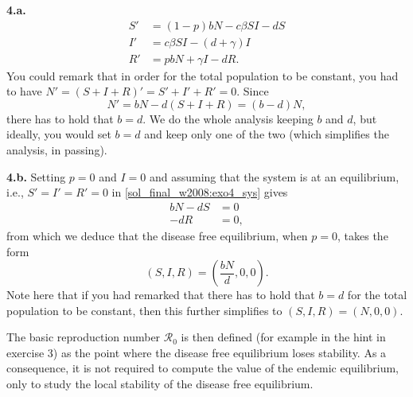 \documentclass[12pt]{article}
\theoremstyle{plain}
\def\Rzero{\mathcal{R}_0}
\begin{document}
\textbf{4.a.}
\begin{subequations}\label{sol_final_w2008:exo4_sys}
\begin{align}
S' &= (1-p)bN-c\beta SI-dS \\
I' &= c\beta SI-(d+\gamma)I \\
R' &= pbN+\gamma I-dR.
\end{align}
\end{subequations}
You could remark that in order for the total population to be constant, you had to have $N'=(S+I+R)'=S'+I'+R'=0$. Since 
\[
N'=bN-d(S+I+R)=(b-d)N,
\]
there has to hold that $b=d$. We do the whole analysis keeping $b$ and $d$, but ideally, you would set $b=d$ and keep only one of the two (which simplifies the analysis, in passing).

\textbf{4.b.}
Setting $p=0$ and $I=0$ and assuming that the system is at an equilibrium, i.e., $S'=I'=R'=0$ in \eqref{sol_final_w2008:exo4_sys} gives
\begin{align*}
bN-dS &=0 \\
-dR &=0,
\end{align*}
from which we deduce that the disease free equilibrium, when $p=0$, takes the form
\[
(S,I,R)=\left(\frac{bN}d,0,0\right).
\]
Note here that if you had remarked that there has to hold that $b=d$ for the total population to be constant, then this further simplifies to $(S,I,R)=(N,0,0)$.

The basic reproduction number $\Rzero$ is then defined (for example in the hint in exercise 3) as the point where the disease free equilibrium loses stability. As a consequence, it is not required to compute the value of the endemic equilibrium, only to study the local stability of the disease free equilibrium.
\end{document}
